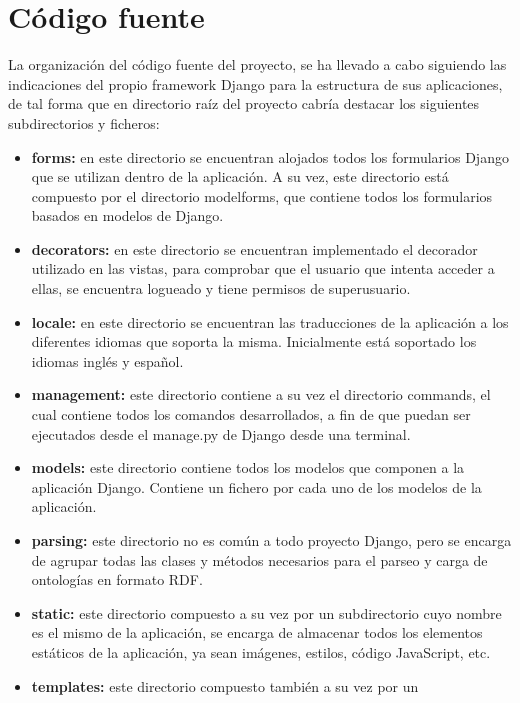 \section{Código fuente}
La organización del código fuente del proyecto, se ha llevado a cabo siguiendo
las indicaciones del propio framework Django para la estructura de sus
aplicaciones, de tal forma que en directorio raíz del proyecto cabría destacar
los siguientes subdirectorios y ficheros:
\begin{itemize}
    \item \textbf{forms:} en este directorio se encuentran alojados todos los
        formularios Django que se utilizan dentro de la aplicación. A su vez,
        este directorio está compuesto por el directorio modelforms, que
        contiene todos los formularios basados en modelos de Django.
    \item \textbf{decorators:} en este directorio se encuentran implementado el
        decorador utilizado en las vistas, para comprobar que el usuario que
        intenta acceder a ellas, se encuentra logueado y tiene permisos de
        superusuario.
    \item \textbf{locale:} en este directorio se encuentran las traducciones de
        la aplicación a los diferentes idiomas que soporta la misma.
        Inicialmente está soportado los idiomas inglés y español.
    \item \textbf{management:} este directorio contiene a su vez el directorio
        commands, el cual contiene todos los comandos desarrollados, a fin de
        que puedan ser ejecutados desde el manage.py de Django desde una
        terminal.
    \item \textbf{models:} este directorio contiene todos los modelos que
        componen a la aplicación Django. Contiene un fichero por cada uno de los
        modelos de la aplicación.
    \item \textbf{parsing:} este directorio no es común a todo proyecto Django,
        pero se encarga de agrupar todas las clases y métodos necesarios para el
        parseo y carga de ontologías en formato RDF.
    \item \textbf{static:} este directorio compuesto a su vez por un
        subdirectorio cuyo nombre es el mismo de la aplicación, se encarga de
        almacenar todos los elementos estáticos de la aplicación, ya sean
        imágenes, estilos, código JavaScript, etc.
    \item \textbf{templates:} este directorio compuesto también a su vez por un

\end{itemize}
